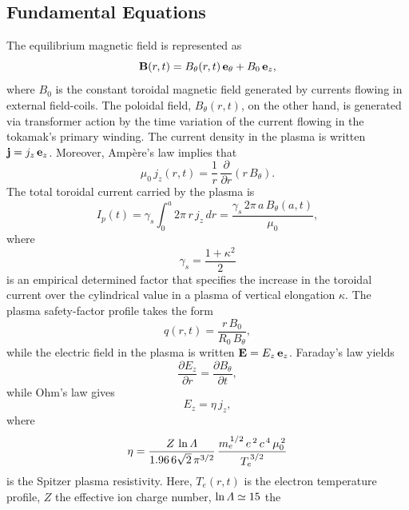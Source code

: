 \documentclass[12pt,prb,aps]{revtex4-1}
\begin{document}
\subsection{Fundamental Equations}
The equilibrium magnetic field is represented as
\begin{equation}
{\bf B}(r,t) = B_\theta(r,t)\,{\bf e}_\theta+ B_0\,{\bf e}_z,
\end{equation}
where $B_0$ is the constant toroidal magnetic field generated by  currents flowing in external  field-coils. The poloidal field, $B_\theta(r,t)$, on the other hand, is generated
via transformer action by the time variation of the current flowing in the tokamak's primary winding. The current density in the plasma is written ${\bf j}= j_z\,{\bf e}_z$. Moreover, Amp\`{e}re's law implies that
\begin{equation}
\mu_0\,j_z(r,t) = \frac{1}{r}\,\frac{\partial}{\partial r}(r\,B_\theta).
\end{equation}
The total toroidal current carried by the plasma is
\begin{equation}
I_p(t)= \gamma_s\int_0^a 2\pi\,r\,j_z\,dr = \frac{\gamma_s\,2\pi\,a\,B_\theta(a,t)}{\mu_0},
\end{equation}
where
\begin{equation}
\gamma_s = \frac{1+\kappa^2}{2}
\end{equation}
is an empirical determined factor that specifies the increase in the toroidal current over the cylindrical value in a plasma of vertical elongation $\kappa$.\cite{creely,uckam}
The plasma safety-factor profile takes the form 
\begin{equation}
q(r,t) = \frac{r\,B_0}{R_0\,B_\theta},
\end{equation}
while the electric field in the plasma is written ${\bf E}= E_z\,{\bf e}_z$. Faraday's law yields
\begin{equation}
\frac{\partial E_z}{\partial r} = \frac{\partial B_\theta}{\partial t},
\end{equation}
while Ohm's law gives
\begin{equation}
E_z = \eta\,j_z,
\end{equation}
where
\begin{equation}
\eta = \frac{Z\,\ln{\mit\Lambda}}{1.96\,6\sqrt{2}\,\pi^{3/2}}\,\frac{m_e^{\,1/2}\,e^{\,2}\,c^{\,4}\,\mu_0^{\,2}}{T_e^{\,3/2}}
\end{equation}
is the Spitzer plasma resistivity.\cite{spitzer,fitz} Here, $T_e(r,t)$ is the electron temperature profile, $Z$ the effective ion charge number, $\ln{\mit\Lambda}\simeq 15$ the
\end{document}
